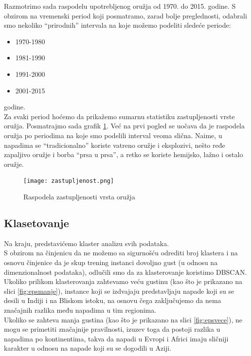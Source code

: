 \documentclass[a4paper]{article}
\begin{document}
Razmotrimo sada raspodelu upotrebljenog oružja od 1970. do 2015. godine. S obzirom na vremenski period koji posmatramo, zarad bolje preglednosti, odabrali smo nekoliko ``prirodnih'' intervala na koje možemo podeliti sledeće periode: 
\begin{itemize}
	\item 1970-1980
	\item 1981-1990
	\item 1991-2000
	\item 2001-2015\\ 
\end{itemize} 
godine.\\
Za svaki period hoćemo da prikažemo sumarnu statistiku zastupljenosti vrste oružja. Posmatrajmo sada grafik \ref{fig:oruzja}. Već na prvi pogled se uočava da je raspodela oružja po periodima na koje smo podelili interval veoma slična. Naime, u napadima se ``tradicionalno'' koriste vatreno oružje i eksplozivi, nešto ređe zapaljivo oružje i borba ``prsa u prsa'', a retko se koriste hemijsko, lažno i ostalo oružje.

\begin{figure}[h!]
\centering
\texttt{[image: zastupljenost.png]}
\caption{Raspodela zastupljenosti vrsta oružja}
\label{fig:oruzja}
\end{figure} 

\subsection{Klasetovanje}

Na kraju, predstavićemo klaster analizu svih podataka.\\
S obzirom na činjenicu da ne možemo sa sigurnošću odrediti broj klastera i na osnovu činjenice da je skup trening instanci dovoljno gust (u odnosu na dimenzionalnost podataka), odlučili smo da za klasterovanje koristimo DBSCAN.	\\

Ukoliko prilikom klasterovanja zahtevamo veću gustinu (kao što je prikazano na slici \ref{fig:epsmanje}), instance koji se izdvajaju predstavljaju napade koji su se desili u Indiji i na Bliskom istoku, na osnovu čega zaključujemo da nema značajnih razlika među napadima u tim regionima. \\

Ukoliko se zahteva manja gustina (kao što je prikazano na slici \ref{fig:epsvece}), ne mogu se primetiti značajnije pravilnosti, izuzev toga da postoji razlika u napadima po kontinentima, takva da napadi u Evropi i Africi imaju sličniji karakter u odnosu na napade koji su se dogodili u Aziji.\\
   
\end{document}
